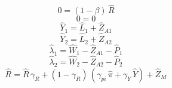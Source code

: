 \begin{dmath}
0=\left(1-{{\beta}}\right)\, {{\hat{R}}}
\end{dmath}
\begin{dmath}
0=0
\end{dmath}
\begin{dmath}
{{\hat{Y}_{1}}}={{\hat{L}_{1}}}+{{\hat{Z}_{A1}}}
\end{dmath}
\begin{dmath}
{{\hat{Y}_{2}}}={{\hat{L}_{2}}}+{{\hat{Z}_{A2}}}
\end{dmath}
\begin{dmath}
{{\hat{\lambda}_{1}}}={{\hat{W}_{1}}}-{{\hat{Z}_{A1}}}-{{\hat{P}_{1}}}
\end{dmath}
\begin{dmath}
{{\hat{\lambda}_{2}}}={{\hat{W}_{2}}}-{{\hat{Z}_{A2}}}-{{\hat{P}_{2}}}
\end{dmath}
\begin{dmath}
{{\hat{R}}}={{\hat{R}}}\, {{\gamma_{R}}}+\left(1-{{\gamma_{R}}}\right)\, \left({{\gamma_{pi}}}\, {{\hat{\pi}}}+{{\gamma_{Y}}}\, {{\hat{Y}}}\right)+{{\hat{Z}_M}}
\end{dmath}
